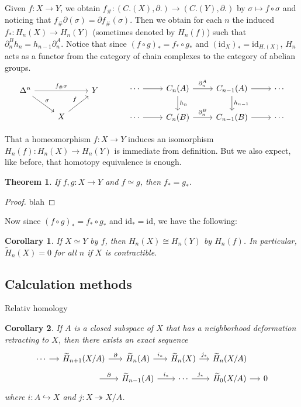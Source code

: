 \documentclass[11pt]{article}
\theoremstyle{definition}
\theoremstyle{plain}
\newtheorem*{corollary}{Corollary}
\newtheorem{theorem}{Theorem}[section]
\theoremstyle{remark}
\newcommand{\id}{\textrm{id}}
\begin{document}
Given $f:X\to Y$, we obtain $f_\#:(C.(X),\partial.)\to(C.(Y),\partial.)$ by $\sigma\mapsto f\circ\sigma$ and noticing that $f_\#\partial(\sigma)=\partial f_\#(\sigma)$. Then we obtain for each $n$ the induced $f_\ast:H_n(X)\to H_n(Y)$ (sometimes denoted by $H_n(f)$) such that $\partial_n^Bh_n=h_{n-1}\partial_n^A$. Notice that since $(f\circ g)_\ast=f_\ast\circ g_\ast$ and $(\id_X)_\ast=\id_{H.(X)}$, $H_n$ acts as a functor from the category of chain complexes to the category of abelian groups.
\[\begin{tikzcd}
\Delta^n\arrow{dr}{\sigma}\arrow{rr}{f_\#\sigma}&&Y\\
&X\arrow{ur}{f}
\end{tikzcd}\quad\quad\quad\begin{tikzcd}
\cdots\arrow{r}&C_n(A)\arrow{d}{h_n}\arrow{r}{\partial_n^A}&C_{n-1}(A)\arrow{d}{h_{n-1}}\arrow{r}&\cdots\\
\cdots\arrow{r}&C_n(B)\arrow{r}{\partial_n^B}&C_{n-1}(B)\arrow{r}&\cdots
\end{tikzcd}\]

That a homeomorphism $f:X\to Y$ induces an isomorphism $H_n(f):H_n(X)\to H_n(Y)$ is immediate from definition. But we also expect, like before, that homotopy equivalence is enough.\medbreak

\begin{theorem}
If $f,g:X\to Y$ and $f\simeq g$, then $f_\ast=g_\ast$.
\end{theorem}
\begin{proof}
blah
\end{proof}

Now since $(f\circ g)_\ast=f_\ast\circ g_\ast$ and $\id_\ast=\id$, we have the following:

\begin{corollary}
If $X\simeq Y$ by $f$, then $H_n(X)\cong H_n(Y)$ by $H_n(f)$. In particular,     $\widetilde{H}_n(X)=0$ for all $n$ if $X$ is contractible.
\end{corollary}

\subsection{Calculation methods}\label{12}

Relativ homology

\begin{corollary}
If $A$ is a closed subspace of $X$ that has a neighborhood deformation retracting to $X$, then there exists an exact sequence
\[\begin{tikzcd}[row sep=tiny, column sep=small]
\cdots\arrow{r}&\widetilde{H}_{n+1}(X/A)\arrow{r}{\partial}&\widetilde{H}_n(A)\arrow{r}{i_\ast}&\widetilde{H}_n(X)\arrow{r}{j_\ast}&\widetilde{H}_n(X/A)\\
&\quad\quad\quad\arrow{r}{\partial}&\widetilde{H}_{n-1}(A)\arrow{r}{i_\ast}&\cdots\arrow{r}{j_\ast}&\widetilde{H}_0(X/A)\arrow{r}&0
\end{tikzcd}\]
where $i:A\hookrightarrow X$ and $j:X\twoheadrightarrow X/A$.
\end{corollary}
\end{document}
